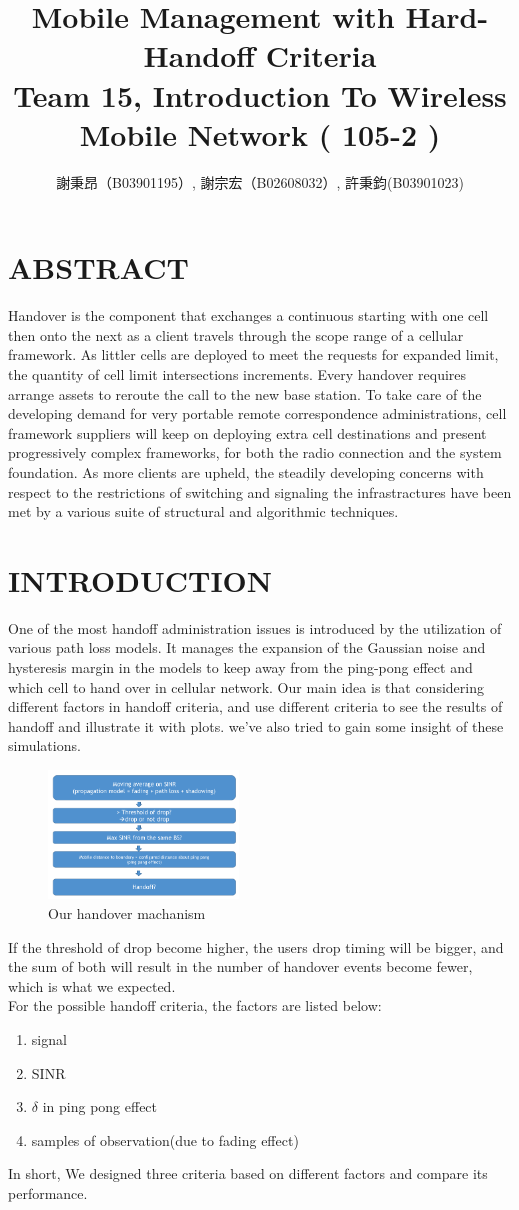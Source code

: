 \documentclass[a4paper]{IEEEtran}
\title{%
    Mobile Management with Hard-Handoff Criteria \\{\large Team 15, Introduction To Wireless Mobile Network ( 105-2 )}
}
\author{謝秉昂（B03901195）, 謝宗宏（B02608032）, 許秉鈞(B03901023)}
\begin{document}
\maketitle
\section{\textbf{ABSTRACT}}
Handover is the component that exchanges a continuous starting with one cell then onto the next as a client travels through the scope range of a cellular framework. As littler cells are deployed to meet the requests for expanded limit, the quantity of cell limit intersections increments. Every handover requires arrange assets to reroute the call to the new base station. To take care of the developing demand for very portable remote correspondence administrations, cell framework suppliers will keep on deploying extra cell destinations and present progressively complex frameworks, for both the radio connection and the system foundation. As more clients are upheld, the steadily developing concerns with respect to the restrictions of switching and signaling the infrastractures have been met by a various suite of structural and algorithmic techniques.



\section{\textbf{INTRODUCTION}}
One of the most handoff administration issues is introduced by the utilization of various path loss models. It manages the expansion of the Gaussian noise and hysteresis margin in the models to keep away from the ping-pong effect and which cell to hand over in cellular network. Our main idea is that considering different factors in handoff criteria, and use different criteria to see the results of handoff and illustrate it with plots. we've also tried to gain some insight of these simulations.
\begin{figure}[h]
    \includegraphics[width=0.45\textwidth]{diagram/1}
    \caption{Our handover machanism}
\end{figure}
If the threshold of drop become higher, the users drop timing will be bigger, and the sum of both will result in the number of handover events become fewer, which is what we expected. \\
For the possible handoff criteria, the factors are listed below:
\begin{enumerate}
\item{signal}
\item{SINR}
\item{ $\delta$ in ping pong effect}
\item{samples of observation(due to fading effect)}
\end{enumerate}
In short, We designed three criteria based on different factors and compare its performance.
\end{document}
